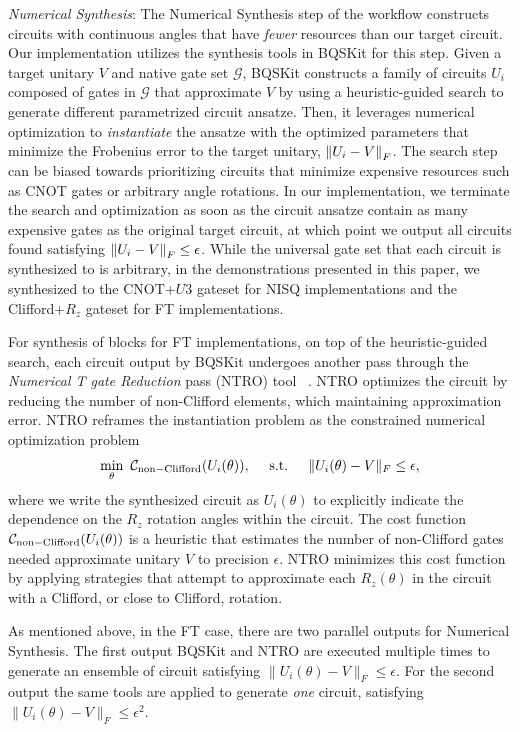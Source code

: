 \emph{Numerical Synthesis}: The Numerical Synthesis step of the workflow constructs circuits with continuous angles that have \emph{fewer} resources than our target circuit. Our implementation utilizes the synthesis tools in BQSKit \cite{bqskit} for this step. Given a target unitary $V$ and native gate set $\mathcal{G}$, BQSKit constructs a family of circuits $U_i$ composed of gates in $\mathcal{G}$ that approximate $V$ by using a heuristic-guided search \cite{leap, qsearch} to generate different parametrized circuit ansatze. Then, it leverages numerical optimization to \emph{instantiate} the ansatze with the optimized parameters that minimize the Frobenius error to the target unitary, $\left\lVert U_i-V \right\rVert_F$. The search step can be biased towards prioritizing circuits that minimize expensive resources such as CNOT gates or arbitrary angle rotations. In our implementation, we terminate the search and optimization as soon as the circuit ansatze contain as many expensive gates as the original target circuit, at which point we output all circuits found satisfying $\left\lVert U_i-V \right\rVert_F\leq \epsilon$. While the universal gate set that each circuit is synthesized to is arbitrary, in the demonstrations presented in this paper, we synthesized to the CNOT+$U3$ gateset for NISQ implementations and the Clifford+$R_z$ gateset for FT implementations. 

For synthesis of blocks for FT implementations, on top of the heuristic-guided search, each circuit output by BQSKit undergoes another pass through the \emph{Numerical T gate Reduction} pass (NTRO) tool ~\cite{ntro}. NTRO optimizes the circuit by reducing the number of non-Clifford elements, which maintaining approximation error. NTRO reframes the instantiation problem as the constrained numerical optimization problem
\begin{equation}
    \min_\theta ~ \mathcal{C}_{\rm non-Clifford}(U_i(\theta)), \quad \text{ s.t. } \quad \|U_i(\theta) - V\|_F \leq \epsilon, \nonumber
\end{equation} 
where we write the synthesized circuit as $U_i(\theta)$ to explicitly indicate the dependence on the $R_z$ rotation angles within the circuit. The cost function $\mathcal{C}_{\rm non-Clifford}(U_i(\theta))$ is a heuristic that estimates the number of non-Clifford gates needed approximate unitary $V$ to precision $\epsilon$. NTRO minimizes this cost function by applying strategies that attempt to approximate each $R_z(\theta)$ in the circuit with a Clifford, or close to Clifford, rotation.

As mentioned above, in the FT case, there are two parallel outputs for Numerical Synthesis. The first output BQSKit and NTRO are executed multiple times to generate an ensemble of circuit satisfying $\|U_i(\theta) - V\|_F \leq \epsilon$. For the second output the same tools are applied to generate \emph{one} circuit, satisfying $\|U_i(\theta) - V\|_F \leq \epsilon^2$.

